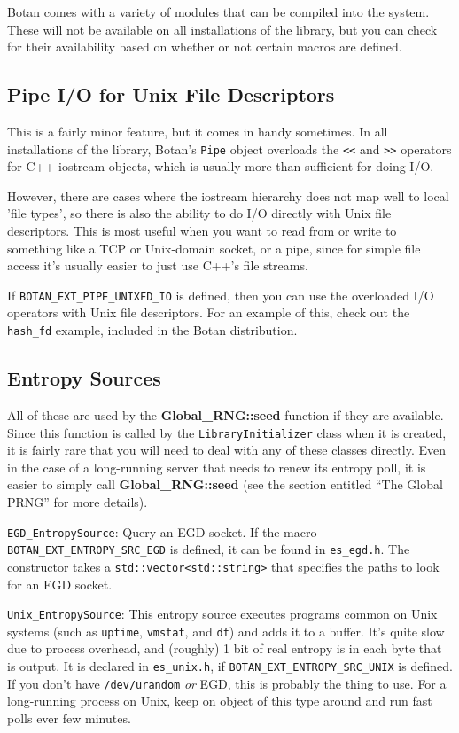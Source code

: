 \documentclass{article}
\newcommand{\filename}[1]{\texttt{#1}}
\newcommand{\macro}[1]{\texttt{#1}}
\newcommand{\function}[1]{\textbf{#1}}
\newcommand{\keyword}[1]{\texttt{#1}}
\newcommand{\type}[1]{\texttt{#1}}
\begin{document}
Botan comes with a variety of modules that can be compiled into the system.
These will not be available on all installations of the library, but you can
check for their availability based on whether or not certain macros are
defined.

\subsection{Pipe I/O for Unix File Descriptors}

This is a fairly minor feature, but it comes in handy sometimes. In all
installations of the library, Botan's \type{Pipe} object overloads the
\keyword{<<} and \keyword{>>} operators for C++ iostream objects, which is
usually more than sufficient for doing I/O.

However, there are cases where the iostream hierarchy does not map well to
local 'file types', so there is also the ability to do I/O directly with Unix
file descriptors. This is most useful when you want to read from or write to
something like a TCP or Unix-domain socket, or a pipe, since for simple file
access it's usually easier to just use C++'s file streams.

If \macro{BOTAN\_EXT\_PIPE\_UNIXFD\_IO} is defined, then you can use the
overloaded I/O operators with Unix file descriptors. For an example of this,
check out the \filename{hash\_fd} example, included in the Botan distribution.

\subsection{Entropy Sources}

All of these are used by the \function{Global\_RNG::seed} function if they are
available. Since this function is called by the \type{LibraryInitializer} class
when it is created, it is fairly rare that you will need to deal with any of
these classes directly. Even in the case of a long-running server that needs to
renew its entropy poll, it is easier to simply call
\function{Global\_RNG::seed} (see the section entitled ``The Global PRNG'' for
more details).

\noindent
\type{EGD\_EntropySource}: Query an EGD socket. If the macro
\macro{BOTAN\_EXT\_ENTROPY\_SRC\_EGD} is defined, it can be found in
\filename{es\_egd.h}. The constructor takes a \type{std::vector<std::string>}
that specifies the paths to look for an EGD socket.

\noindent
\type{Unix\_EntropySource}: This entropy source executes programs common on
Unix systems (such as \filename{uptime}, \filename{vmstat}, and \filename{df})
and adds it to a buffer. It's quite slow due to process overhead, and (roughly)
1 bit of real entropy is in each byte that is output. It is declared in
\filename{es\_unix.h}, if \macro{BOTAN\_EXT\_ENTROPY\_SRC\_UNIX} is
defined. If you don't have \filename{/dev/urandom} \emph{or} EGD, this is
probably the thing to use. For a long-running process on Unix, keep on object
of this type around and run fast polls ever few minutes.
\end{document}
